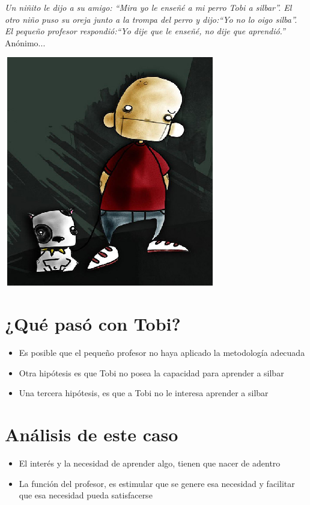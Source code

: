 \begin{minipage}{10 cm}{
\Large
\textit{   Un niñito le dijo a su amigo: ``Mira yo le enseñé a mi perro Tobi a silbar''. El otro niño puso su oreja junto a la trompa del perro y dijo:``Yo no lo oigo silba''. El pequeño profesor respondió:``Yo dije que le enseñé, no dije que aprendió.''} \normalsize Anónimo...
}
\end{minipage}
\begin{minipage}{6 cm}{
\begin{center}
\includegraphics[scale=0.4]{a-fig1}
\end{center}
}
\end{minipage}

\section*{¿Qué pasó con Tobi?}
\begin{itemize}
\item Es posible que el pequeño profesor no haya aplicado la metodología adecuada
\item Otra hipótesis es que Tobi no posea la capacidad para aprender a silbar
\item Una tercera hipótesis, es que a Tobi no le interesa aprender a silbar
\end{itemize}

\section*{Análisis de este caso}
\begin{itemize}
\item El interés y la necesidad de aprender algo, tienen que nacer de adentro
\item La función del profesor, es estimular que se genere esa necesidad y facilitar que esa necesidad pueda satisfacerse 
\end{itemize}

